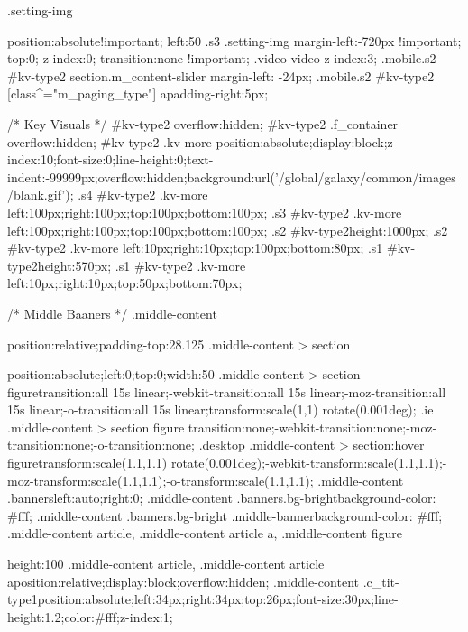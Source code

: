 			.setting-img {position:absolute!important; left:50%
			.s3 .setting-img {margin-left:-720px !important; top:0; z-index:0; transition:none !important;}
			.video video {z-index:3;}
			.mobile.s2 #kv-type2 section.m_content-slider {margin-left: -24px;}
			.mobile.s2 #kv-type2 [class^="m_paging_type"] a{padding-right:5px;}

			/* Key Visuals */
			#kv-type2 {overflow:hidden;}
			#kv-type2 .f_container {overflow:hidden;}
			#kv-type2 .kv-more {position:absolute;display:block;z-index:10;font-size:0;line-height:0;text-indent:-99999px;overflow:hidden;background:url('/global/galaxy/common/images/blank.gif');}
			.s4 #kv-type2 .kv-more {left:100px;right:100px;top:100px;bottom:100px;}
			.s3 #kv-type2 .kv-more {left:100px;right:100px;top:100px;bottom:100px;}
			.s2 #kv-type2{height:1000px;}
			.s2 #kv-type2 .kv-more {left:10px;right:10px;top:100px;bottom:80px;}
			.s1 #kv-type2{height:570px;}
			.s1 #kv-type2 .kv-more {left:10px;right:10px;top:50px;bottom:70px;}


			/* Middle Baaners */
			.middle-content{position:relative;padding-top:28.125%
			.middle-content > section{position:absolute;left:0;top:0;width:50%
			.middle-content > section figure{transition:all 15s linear;-webkit-transition:all 15s linear;-moz-transition:all 15s linear;-o-transition:all 15s linear;transform:scale(1,1) rotate(0.001deg);}
			.ie .middle-content > section figure {transition:none;-webkit-transition:none;-moz-transition:none;-o-transition:none;}
			.desktop .middle-content > section:hover figure{transform:scale(1.1,1.1) rotate(0.001deg);-webkit-transform:scale(1.1,1.1);-moz-transform:scale(1.1,1.1);-o-transform:scale(1.1,1.1);}
			.middle-content .banners{left:auto;right:0;}
			.middle-content .banners.bg-bright{background-color: #fff;}
			.middle-content .banners.bg-bright .middle-banner{background-color: #fff;}
			.middle-content article,
			.middle-content article a,
			.middle-content figure{ height:100%
			.middle-content article,
			.middle-content article a{position:relative;display:block;overflow:hidden;}
			.middle-content .c_tit-type1{position:absolute;left:34px;right:34px;top:26px;font-size:30px;line-height:1.2;color:#fff;z-index:1;}

}}}}
